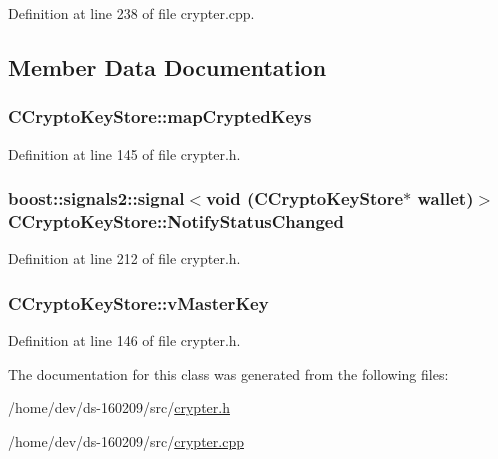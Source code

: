 Definition at line 238 of file crypter.\+cpp.



\subsection{Member Data Documentation}
\hypertarget{class_c_crypto_key_store_ad1fb9b23eee7a352617209ee2e4f3498}{}
\subsubsection[{map\+Crypted\+Keys}]{ C\+Crypto\+Key\+Store\+::map\+Crypted\+Keys\hspace{0.3cm}{\ttfamily [protected]}}\label{class_c_crypto_key_store_ad1fb9b23eee7a352617209ee2e4f3498}


Definition at line 145 of file crypter.\+h.

\hypertarget{class_c_crypto_key_store_a251b9ed228a19ab39d542985b425fc85}{}
\subsubsection[{Notify\+Status\+Changed}]{\setlength{\rightskip}{0pt plus 5cm}boost\+::signals2\+::signal$<$void ({\bf C\+Crypto\+Key\+Store}$\ast$ wallet)$>$ C\+Crypto\+Key\+Store\+::\+Notify\+Status\+Changed}\label{class_c_crypto_key_store_a251b9ed228a19ab39d542985b425fc85}


Definition at line 212 of file crypter.\+h.

\hypertarget{class_c_crypto_key_store_ac74e458a90ce17a95e238bad724df3fd}{}
\subsubsection[{v\+Master\+Key}]{ C\+Crypto\+Key\+Store\+::v\+Master\+Key\hspace{0.3cm}{\ttfamily [protected]}}\label{class_c_crypto_key_store_ac74e458a90ce17a95e238bad724df3fd}


Definition at line 146 of file crypter.\+h.



The documentation for this class was generated from the following files\+:\begin{DoxyCompactItemize}
\item 
/home/dev/ds-\/160209/src/\hyperlink{crypter_8h}{crypter.\+h}\item 
/home/dev/ds-\/160209/src/\hyperlink{crypter_8cpp}{crypter.\+cpp}\end{DoxyCompactItemize}

